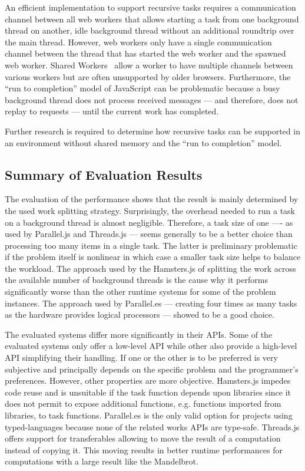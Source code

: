 An efficient implementation to support recursive tasks requires a communication channel between all web workers that allows starting a task from one background thread on another, idle background thread without an additional roundtrip over the main thread. However, web workers only have a single communication channel between the thread that has started the web worker and the spawned web worker. Shared Workers~\cite[section 4.6.4]{w3cWebWorker} allow a worker to have multiple channels between various workers but are often unsupported by older browsers. Furthermore, the \enquote{run to completion} model of JavaScript can be problematic because a busy background thread does not process received messages --- and therefore, does not replay to requests --- until the current work has completed.

Further research is required to determine how recursive tasks can be supported in an environment without shared memory and the \enquote{run to completion} model.

\subsection{Summary of Evaluation Results}
The evaluation of the performance shows that the result is mainly determined by the used work splitting strategy. Surprisingly, the overhead needed to run a task on a background thread is almost negligible. Therefore, a task size of one ---- as used by Parallel.js and Threads.js --- seems generally to be a better choice than processing too many items in a single task. The latter is preliminary problematic if the problem itself is nonlinear in which case a smaller task size helps to balance the workload. The approach used by the Hamsters.js of splitting the work across the available number of background threads is the cause why it performs significantly worse than the other runtime systems for some of the problem instances. The approach used by Parallel.es --- creating four times as many tasks as the hardware provides logical processors --- showed to be a good choice. 

The evaluated systems differ more significantly in their APIs. Some of the evaluated systems only offer a low-level API while other also provide a high-level API simplifying their handling. If one or the other is to be preferred is very subjective and principally depends on the specific problem and the programmer's preferences. However, other properties are more objective. Hamsters.js impedes code reuse and is unsuitable if the task function depends upon libraries since it does not permit to expose additional functions, e.g. functions imported from libraries, to task functions. Parallel.es is the only valid option for projects using typed-languages because none of the related works APIs are type-safe. Threads.js offers support for transferables allowing to move the result of a computation instead of copying it. This moving results in better runtime performances for computations with a large result like the Mandelbrot.


